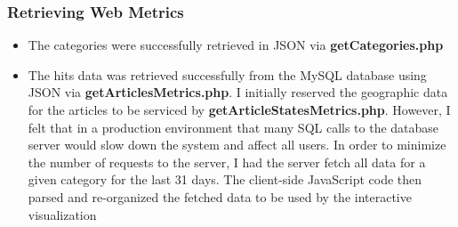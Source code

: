 \documentclass[12pt]{article}
\begin{document}
\subsubsection{Retrieving Web Metrics}
\begin{itemize}
\item The categories were successfully retrieved in JSON via \textbf{getCategories.php}
\item The hits data was retrieved successfully from the MySQL database using JSON via \textbf{getArticlesMetrics.php}. I initially reserved the geographic data for the articles to be serviced by \textbf{getArticleStatesMetrics.php}. However, I felt that in a production environment that many SQL calls to the database server would slow down the system and affect all users. In order to minimize the number of requests to the server, I had the server fetch all data for a given category for the last 31 days. The client-side JavaScript code then parsed and re-organized the fetched data to be used by the interactive visualization
\end{itemize}
\end{document}
